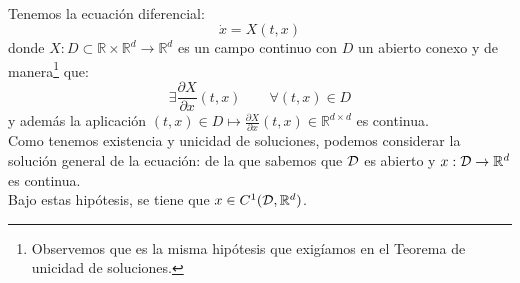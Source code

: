 \begin{teo}\label{teo:dif_cond}~\\
    \noindent
    Tenemos la ecuación diferencial:
    \begin{equation*}
        \dot{x} = X(t,x)
    \end{equation*}
    donde $X:D\subset\mathbb{R}\times\mathbb{R}^d\to \mathbb{R}^d$ es un campo continuo con $D$ un abierto conexo y de manera\footnote{Observemos que es la misma hipótesis que exigíamos en el Teorema de unicidad de soluciones.} que:
    \begin{equation*}
        \exists \frac{\partial X}{\partial x}(t,x) \qquad \forall (t,x)\in D
    \end{equation*}
    y además la aplicación $(t,x)\in D\longmapsto \frac{\partial X}{\partial x}(t,x)\in \mathbb{R}^{d\times d}$ es continua.\\

    \noindent
    Como tenemos existencia y unicidad de soluciones, podemos considerar la solución general de la ecuación:
    de la que sabemos que $\mathcal{D}$ es abierto y $x:\mathcal{D}\to\mathbb{R}^d$ es continua.\\

    \noindent
    Bajo estas hipótesis, se tiene que $x\in C^1(\mathcal{D},\mathbb{R}^d)$.
\end{teo}

